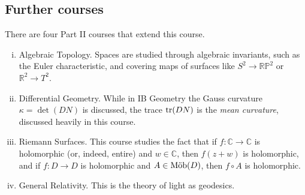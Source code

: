 \subsection{Further courses}
There are four Part II courses that extend this course.
\begin{enumerate}[(i)]
	\item Algebraic Topology. Spaces are studied through algebraic invariants, such as the Euler characteristic, and covering maps of surfaces like \( S^2 \to \mathbb R \mathbb P^2 \) or \( \mathbb R^2 \to T^2 \).
	\item Differential Geometry. While in IB Geometry the Gauss curvature \( \kappa = \det (DN) \) is discussed, the trace \( \tr (DN) \) is the \textit{mean curvature}, discussed heavily in this course.
	\item Riemann Surfaces. This course studies the fact that if \( f \colon \mathbb C \to \mathbb C \) is holomorphic (or, indeed, entire) and \( w \in \mathbb C \), then \( f(z+w) \) is holomorphic, and if \( f \colon D \to D \) is holomorphic and \( A \in \text{M\"ob}(D) \), then \( f \circ A \) is holomorphic.
	\item General Relativity. This is the theory of light as geodesics.
\end{enumerate}
